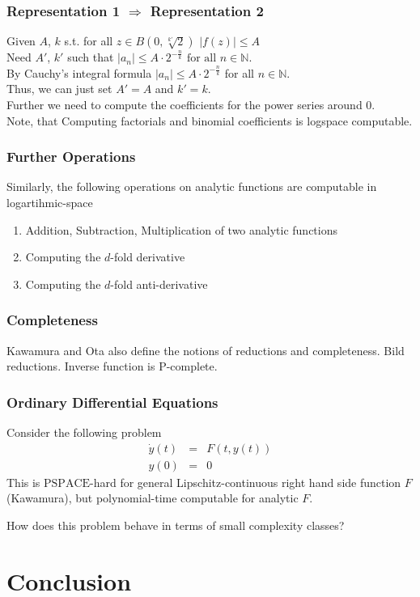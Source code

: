 \documentclass[xcolor=pdftex,dvipsnames,table]{beamer}
\newcommand{\N}{\ensuremath{\mathbb{N}}}
\newcommand{\abs}[1]{\left|#1\right|}
\newcommand{\pspace}{\ensuremath{\text{PSPACE}}\xspace}
\begin{document}
\begin{frame}
\frametitle{Representation 1 $\Rightarrow$ Representation 2}
Given $A$, $k$ s.t. for all $z \in B(0, \sqrt[k']{2})$
$\abs{f(z)} \leq A$\\
Need $A'$, $k'$ such that $\abs{a_n} \leq A \cdot 2^{-\frac{n}{k}} \text{ for all } n \in \N.$\\
By Cauchy's integral formula $\abs{a_n} \leq A \cdot 2^{-\frac{n}{k}}$ for all $n \in \N$. \\
Thus, we can just set $A' = A$ and $k' = k$.\\
\pause
Further we need to compute the coefficients for the power series around $0$.\\
Note, that Computing factorials and binomial coefficients is logspace computable.
\end{frame}
\begin{frame}
\frametitle{Further Operations}
  Similarly, the following operations on analytic functions are computable in logartihmic-space
  \begin{enumerate}
    \item Addition, Subtraction, Multiplication of two analytic functions
    \item Computing the $d$-fold derivative
    \item Computing the $d$-fold anti-derivative
   \end{enumerate}
\end{frame}
\begin{frame}
  \frametitle{Completeness}
  Kawamura and Ota also define the notions of reductions and completeness.
  Bild reductions.
  Inverse function is P-complete.
 \end{frame}
\begin{frame}
  \frametitle{Ordinary Differential Equations}
  Consider the following problem
\begin{eqnarray*}
  \dot y(t) &=& F(t, y(t)) \\
  y(0) &=& 0 
\end{eqnarray*}
This is \pspace-hard for general Lipschitz-continuous right hand side function $F$ (Kawamura),
but polynomial-time computable for analytic $F$.

How does this problem behave in terms of small complexity classes?
 \end{frame}
\section{Conclusion}
\end{document}
